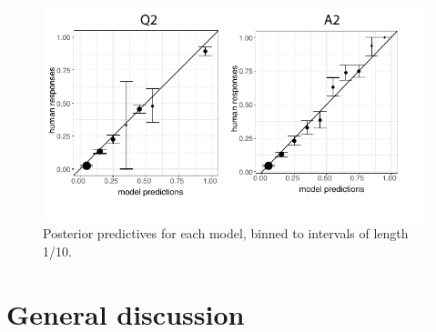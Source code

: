 \documentclass[11pt, floatsintext]{apa6}
\begin{document}
\begin{figure}[t!]
\begin{center}
\includegraphics[scale = .8]{Exp3/predictives.pdf}
\end{center}
\caption{Posterior predictives for each model, binned to intervals of length 1/10.}
\label{fig:exp3predictives}
\end{figure}





\section{General discussion}
\label{sec:gd}
\end{document}
